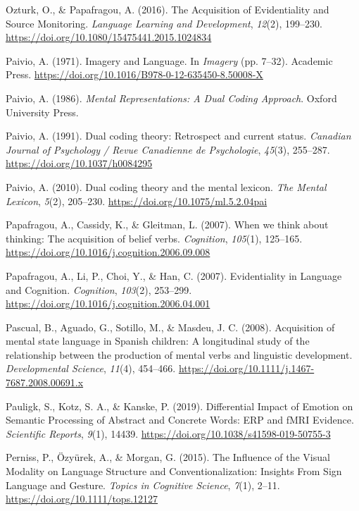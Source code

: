 \documentclass[
  man,floatsintext]{apa6}
\newlength{\cslhangindent}
\newenvironment{CSLReferences}[2] %
 {\begin{list}{}{%
  \setlength{\itemindent}{0pt}
  \setlength{\leftmargin}{0pt}
  \setlength{\parsep}{0pt}
  \ifodd #1
   \setlength{\leftmargin}{\cslhangindent}
   \setlength{\itemindent}{-1\cslhangindent}
  \fi
  \setlength{\itemsep}{#2\baselineskip}}}
 {\end{list}}
\begin{document}
\begin{CSLReferences}{1}{0}
Ozturk, O., \& Papafragou, A. (2016). The {Acquisition} of {Evidentiality} and {Source Monitoring}. \emph{Language Learning and Development}, \emph{12}(2), 199--230. \url{https://doi.org/10.1080/15475441.2015.1024834}

Paivio, A. (1971). Imagery and {Language}. In \emph{Imagery} (pp. 7--32). Academic Press. \url{https://doi.org/10.1016/B978-0-12-635450-8.50008-X}

Paivio, A. (1986). \emph{Mental {Representations}: {A Dual Coding Approach}}. Oxford University Press.

Paivio, A. (1991). Dual coding theory: {Retrospect} and current status. \emph{Canadian Journal of Psychology / Revue Canadienne de Psychologie}, \emph{45}(3), 255--287. \url{https://doi.org/10.1037/h0084295}

Paivio, A. (2010). Dual coding theory and the mental lexicon. \emph{The Mental Lexicon}, \emph{5}(2), 205--230. \url{https://doi.org/10.1075/ml.5.2.04pai}

Papafragou, A., Cassidy, K., \& Gleitman, L. (2007). When we think about thinking: {The} acquisition of belief verbs. \emph{Cognition}, \emph{105}(1), 125--165. \url{https://doi.org/10.1016/j.cognition.2006.09.008}

Papafragou, A., Li, P., Choi, Y., \& Han, C. (2007). Evidentiality in {Language} and {Cognition}. \emph{Cognition}, \emph{103}(2), 253--299. \url{https://doi.org/10.1016/j.cognition.2006.04.001}

Pascual, B., Aguado, G., Sotillo, M., \& Masdeu, J. C. (2008). Acquisition of mental state language in {Spanish} children: A longitudinal study of the relationship between the production of mental verbs and linguistic development. \emph{Developmental Science}, \emph{11}(4), 454--466. \url{https://doi.org/10.1111/j.1467-7687.2008.00691.x}

Pauligk, S., Kotz, S. A., \& Kanske, P. (2019). Differential {Impact} of {Emotion} on {Semantic Processing} of {Abstract} and {Concrete Words}: {ERP} and {fMRI Evidence}. \emph{Scientific Reports}, \emph{9}(1), 14439. \url{https://doi.org/10.1038/s41598-019-50755-3}

Perniss, P., Özyürek, A., \& Morgan, G. (2015). The {Influence} of the {Visual Modality} on {Language Structure} and {Conventionalization}: {Insights From Sign Language} and {Gesture}. \emph{Topics in Cognitive Science}, \emph{7}(1), 2--11. \url{https://doi.org/10.1111/tops.12127}


\end{CSLReferences}
\end{document}

